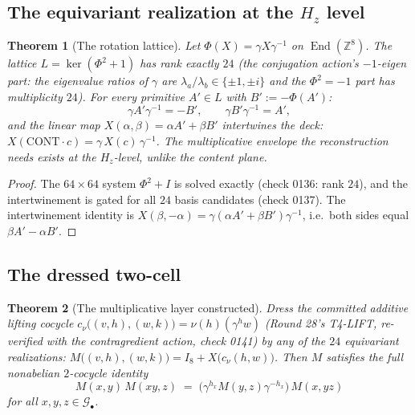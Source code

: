\documentclass[11pt]{article}
\newtheorem{theorem}{Theorem}
\newcommand{\Gbul}{\mathcal{G}_\bullet}
\newcommand{\End}{\operatorname{End}}
\newcommand{\Z}{\mathbb{Z}}
\begin{document}
\subsection{The equivariant realization at the $H_z$ level}

\begin{theorem}[The rotation lattice]\label{th:realize}
Let $\Phi(X)=\gamma X\gamma^{-1}$ on $\End(\Z^8)$. The lattice
$L=\ker(\Phi^2+1)$ has rank exactly $24$ (the conjugation action's
$-1$-eigen part: the eigenvalue ratios of $\gamma$ are
$\lambda_a/\lambda_b\in\{\pm1,\pm i\}$ and the $\Phi^2=-1$ part has
multiplicity $24$). For every primitive $A'\in L$ with
$B':=-\Phi(A')$:
\[
\gamma A'\gamma^{-1}=-B',\qquad \gamma B'\gamma^{-1}=A',
\]
and the linear map $X(\alpha,\beta)=\alpha A'+\beta B'$ intertwines the
deck: $X(\mathrm{CONT}\cdot c)=\gamma\,X(c)\,\gamma^{-1}$. The
multiplicative envelope the reconstruction needs exists at the
$H_z$-level, unlike the content plane.
\end{theorem}

\begin{proof}
The $64\times64$ system $\Phi^2+I$ is solved exactly (check 0136:
rank $24$), and the intertwinement is gated for all $24$ basis
candidates (check 0137). The intertwinement identity is
$X(\beta,-\alpha)=\gamma(\alpha A'+\beta B')\gamma^{-1}$, i.e.\ both
sides equal $\beta A'-\alpha B'$.
\end{proof}

\subsection{The dressed two-cell}

\begin{theorem}[The multiplicative layer constructed]\label{th:dressed}
Dress the committed additive lifting cocycle
$c_\nu\bigl((v,h),(w,k)\bigr)=\nu(h)(\gamma^h w)$ (Round 28's T4-LIFT,
re-verified with the contragredient action, check 0141) by any of the
$24$ equivariant realizations:
$M\bigl((v,h),(w,k)\bigr)=I_8+X\bigl(c_\nu(h,w)\bigr)$. Then $M$
satisfies the full nonabelian $2$-cocycle identity
\[
M(x,y)\,M(xy,z)\;=\;\bigl(\gamma^{h_x}M(y,z)\gamma^{-h_x}\bigr)\,
M(x,yz)
\]
for all $x,y,z\in\Gbul$.
\end{theorem}
\end{document}
